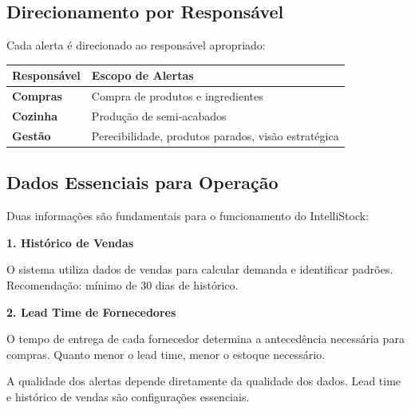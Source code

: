 \subsection{Direcionamento por Responsável}

Cada alerta é direcionado ao responsável apropriado:

\begin{center}
\begin{tabular}{>{\bfseries}l p{9cm}}
\toprule
Responsável & Escopo de Alertas \\
\midrule
Compras   & Compra de produtos e ingredientes \\
Cozinha   & Produção de semi-acabados \\
Gestão    & Perecibilidade, produtos parados, visão estratégica \\
\bottomrule
\end{tabular}
\end{center}

\subsection{Dados Essenciais para Operação}

Duas informações são fundamentais para o funcionamento do IntelliStock:

\textbf{1. Histórico de Vendas}

O sistema utiliza dados de vendas para calcular demanda e identificar padrões.
Recomendação: mínimo de 30 dias de histórico.

\textbf{2. Lead Time de Fornecedores}

O tempo de entrega de cada fornecedor determina a antecedência necessária
para compras. Quanto menor o lead time, menor o estoque necessário.

\begin{infobox}
A qualidade dos alertas depende diretamente da qualidade dos dados.
Lead time e histórico de vendas são configurações essenciais.
\end{infobox}
